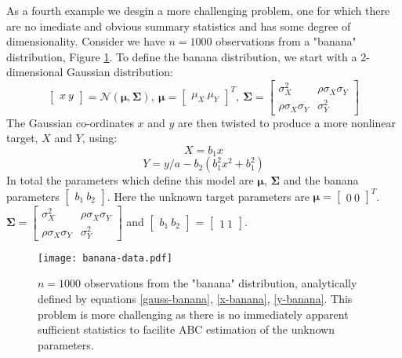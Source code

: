 As a fourth example we desgin a more challenging problem, one for which there are no imediate and obvious summary statistics and has some degree of dimensionality. Consider we have $n = 1000$ observations from a "banana" distribution, Figure \ref{banana-data}. To define the banana distribution, we start with a 2-dimensional Gaussian distribution:
\begin{equation}
\begin{bmatrix}
x\ y
\end{bmatrix}=\mathcal{N}(\bm{\mu},\bm{\Sigma}),\ \bm{\mu} = \begin{bmatrix}
\mu_X\ \mu_Y
\end{bmatrix}^T,\ \bm{\Sigma} = \begin{bmatrix}
\sigma^2_X & \rho\sigma_X\sigma_Y\\
\rho\sigma_X\sigma_Y & \sigma^2_Y
\end{bmatrix} 
\label{gauss-banana}
\end{equation}
The Gaussian co-ordinates $x$ and $y$ are then twisted to produce a more nonlinear target, $X$ and $Y$, using:
\begin{equation}
X = b_1x
\label{x-banana}
\end{equation}
\begin{equation}
Y = y/a-b_2(b_1^2x^2+b_1^2)
\label{y-banana}
\end{equation}
In total the parameters which define this model are $\bm{\mu}$, $\bm{\Sigma}$ and the banana parameters $\begin{bmatrix}
b_1\ b_2
\end{bmatrix}$. Here the unknown target parameters are $\bm{\mu} = \begin{bmatrix}
0\ 0
\end{bmatrix}^T$.
$\bm{\Sigma} = \begin{bmatrix}
\sigma^2_X & \rho\sigma_X\sigma_Y\\
\rho\sigma_X\sigma_Y & \sigma^2_Y
\end{bmatrix}$ and $\begin{bmatrix}
b_1\ b_2
\end{bmatrix}$ = $\begin{bmatrix}
1\ 1
\end{bmatrix}$. 

\begin{figure}[H]
\centering
\texttt{[image: banana-data.pdf]}
\caption{$n = 1000$ observations from the "banana" distribution, analytically defined by equations \ref{gauss-banana}, \ref{x-banana}, \ref{y-banana}. 
This problem is more challenging as there is no immediately apparent sufficient statistics to facilite ABC estimation of the unknown parameters.}
\label{banana-data}
\end{figure}

